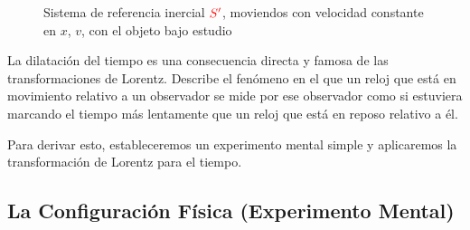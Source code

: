 \documentclass[11pt,a4paper]{article}
\begin{document}
\begin{figure}
    \caption{Sistema de referencia inercial $\color{red}S'$, moviendos con velocidad constante en $x$, $v$, con el objeto bajo estudio }
    \label{fig:movv}
\end{figure}


La dilatación del tiempo es una consecuencia directa y famosa de las transformaciones de Lorentz. Describe el fenómeno en el que un reloj que está en movimiento relativo a un observador se mide por ese observador como si estuviera marcando el tiempo más lentamente que un reloj que está en reposo relativo a él.

Para derivar esto, estableceremos un experimento mental simple y aplicaremos la transformación de Lorentz para el tiempo.

\subsection{La Configuración Física (Experimento Mental)}
\end{document}
